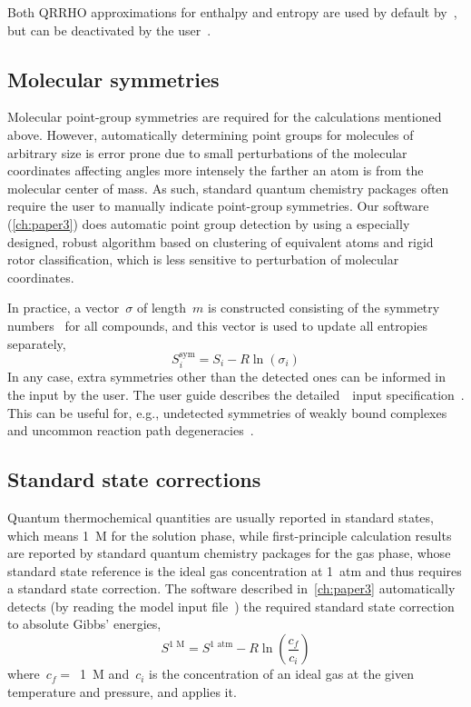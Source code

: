 %
Both QRRHO approximations for enthalpy and entropy are used by default by~\overreact{},
but can be deactivated by the user~\cite{overreactguideinput2022}.

\subsection{Molecular symmetries}%
\label{sec:mol-sym}

Molecular point-group symmetries are required for the calculations mentioned above.
However,
automatically determining point groups for molecules of arbitrary size is error prone due to small perturbations of the molecular coordinates affecting angles more intensely the farther an atom is from the molecular center of mass.
As such,
standard quantum chemistry packages often require the user to manually indicate point-group symmetries.
Our software~\overreact{} (\cref{ch:paper3}) does automatic point group detection by using a especially designed,
robust algorithm based on clustering of equivalent atoms and rigid rotor classification,
which is less sensitive to perturbation of molecular coordinates.

In practice,
a vector~$\sigma$ of length~$m$ is constructed consisting of the symmetry numbers~\cite{Fern_ndez_Ramos_2007,Gilson_2010} for all compounds,
and this vector is used to update all entropies separately,
%
\begin{equation}
	S_i^\text{sym}
	= S_i - R \ln{\left( \sigma_i \right)}
\end{equation}
%
In any case,
extra symmetries other than the detected ones can be informed in the input by the user.
The user guide describes the detailed~\overreact{}~input specification~\cite{overreactguideinput2022}.
This can be useful for,
e.g.,
undetected symmetries of weakly bound complexes~\cite{Gilson_2010} and uncommon reaction path degeneracies~\cite{Fern_ndez_Ramos_2007}.

\subsection{Standard state corrections}

Quantum thermochemical quantities are usually reported in standard states,
which means 1~M for the solution phase,
while first-principle calculation results are reported
by standard quantum chemistry packages for the gas phase,
whose standard state reference is the ideal gas concentration at 1~atm
and thus requires a standard state correction.
The software described in~\cref{ch:paper3} automatically detects
(by reading the model input file~\cite{overreactguideinput2022})
the required standard state correction to absolute Gibbs' energies,
%
\begin{equation}
	S^\text{1~M} = S^\text{1~atm}
	- R \ln{\left( \frac{c_f}{c_i} \right)}
\end{equation}
%
where~$c_f =$~1~M and~$c_i$ is the concentration of an ideal gas at the given temperature and pressure,
and applies it.

